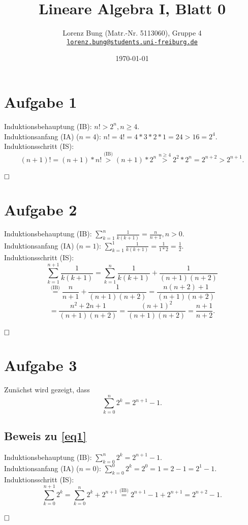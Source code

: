\documentclass[12pt,a4paper]{article}
\title{Lineare Algebra I, Blatt 0}
\author{Lorenz Bung (Matr.-Nr. 5113060), Gruppe 4\\\href{mailto:lorenz.bung@students.uni-freiburg.de}{\texttt{lorenz.bung@students.uni-freiburg.de}}}
\date{\today}
\newcommand{\qed}{\null\nobreak\hfill\square}
\begin{document}
\maketitle


\section*{Aufgabe 1}

Induktionsbehauptung (IB): $n! > 2^n, n \geq 4.$\\
Induktionsanfang (IA) ($n = 4$): $n! = 4! = 4 * 3 * 2 * 1 = 24 > 16 = 2^4.$\\
Induktionsschritt (IS): $$(n + 1)! = (n + 1) * n! \overset{\text{(IB)}}{>} (n + 1) * 2^n \overset{n \geq 4}{>} 2^2 * 2^n = 2^{n + 2} > 2^{n + 1}.$$\\
$\qed$


\section*{Aufgabe 2}

Induktionsbehauptung (IB): $\sum\limits_{k = 1}^n \frac{1}{k (k + 1)} = \frac{n}{n + 1}, n > 0.$\\
Induktionsanfang (IA) ($n = 1$): $\sum\limits_{k = 1}^1 \frac{1}{k (k + 1)} = \frac{1}{1 * 2} = \frac{1}{2}.$\\
Induktionsschritt (IS):
$$\sum\limits_{k = 1}^{n + 1} \frac{1}{k (k + 1)} = \sum\limits_{k = 1}^n \frac{1}{k (k + 1)} + \frac{1}{(n + 1) (n + 2)}$$
$$\overset{\text{(IB)}}{=} \frac{n}{n + 1} + \frac{1}{(n + 1)(n + 2)} = \frac{n(n + 2) + 1}{(n + 1)(n + 2)}$$
$$= \frac{n^2 + 2n + 1}{(n + 1)(n + 2)} = \frac{(n + 1)^2}{(n + 1)(n + 2)} = \frac{n + 1}{n + 2}.$$\\
$\qed$


\section*{Aufgabe 3}
\label{sec:a3}

Zunächst wird gezeigt, dass
\begin{equation}
\label{eq1}
\sum\limits_{k = 0}^n 2^k = 2^{n + 1} - 1.
\end{equation}

\subsection*{Beweis zu \ref{eq1}}
Induktionsbehauptung (IB): $\sum\limits_{k = 0}^n 2^k = 2^{n + 1} - 1.$\\
Induktionsanfang (IA) ($n = 0$): $\sum\limits_{k = 0}^0 2^k = 2^0 = 1 = 2 - 1 = 2^1 - 1$.\\
Induktionsschritt (IS): $$\sum\limits_{k = 0}^{n + 1} 2^k = \sum\limits_{k = 0}^n 2^k + 2^{n + 1} \overset{\text{(IB)}}{=} 2^{n + 1} - 1 + 2^{n + 1} = 2^{n + 2} - 1.$$\\
$\qed$
\end{document}
